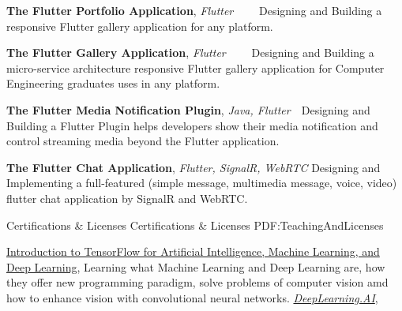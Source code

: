 \documentclass[letterpaper,MMMyyyy,nonstopmode]{resume}
\newcommand{\CVWebpage}{https://aliyazdi.tech}
\begin{document}
\begin{Body}
\BigGap
\BulletItem
\textbf{The Flutter Portfolio Application},
\textit{\small{Flutter}}
\hfill
{\normalsize{
\href{https://snapcraft.io/aliyazdi}
{\faLinux}
\,\SubBulletSymbol\,
\href{https://github.com/aliyazdi75/aliyazdi75.github.io/releases}
{\faAndroid}
\,\SubBulletSymbol\,
\href{\CVWebpage}
{\faGlobe}
\,\SubBulletSymbol\,
\href{https://github.com/aliyazdi75/aliyazdi75.github.io}
{\faGithub}
}}
\Item
Designing and Building a responsive Flutter gallery application for any platform.

\BigGap
\BulletItem
\textbf{The Flutter Gallery Application},
\textit{\small{Flutter}}
\hfill
{\normalsize{
\href{https://medium.com/flutter-community/the-software-engineering-approach-in-cross-platform-programming-with-flutter-part-1-efcdc8a8fc26?source=friends_link&sk=ceb60f56685ce66c7f9574595748f25b}
{\faMedium}
\,\SubBulletSymbol\,
\href{https://github.com/aliyazdi75/gallery/releases}
{\faAndroid}
\,\SubBulletSymbol\,
\href{\CVWebpage/gallery}
{\faGlobe}
\,\SubBulletSymbol\,
\href{https://github.com/aliyazdi75/gallery}
{\faGithub}
}}
\Item
Designing and Building a micro-service architecture responsive Flutter gallery application for Computer Engineering graduates uses in any platform.

\BigGap
\BulletItem
\textbf{The Flutter Media Notification Plugin},
\textit{\small{Java, Flutter}}
\hfill
{\normalsize{
\href{https://pub.dev/packages/flutter_media_notification}
{\faGlobe}
\,\SubBulletSymbol\,
\href{https://github.com/aliyazdi75/flutter_media_notification}
{\faGithub}
}}
\Item
Designing and Building a Flutter Plugin helps developers show their media notification and control streaming media beyond the Flutter application.

\BigGap
\BulletItem
\textbf{The Flutter Chat Application},
\textit{\small{Flutter, SignalR, WebRTC}}
\hfill
{\normalsize{
\href{https://github.com/aliyazdi75/flutter_chat}
{\faGithub}
}}
\Item
Designing and Implementing a full-featured (simple message, multimedia message, voice, video) flutter chat application by SignalR and WebRTC.


\Section
{Certifications \newline\&
Licenses}
{Certifications \& Licenses}
{PDF:TeachingAndLicenses}

\BulletItem
\href{https://coursera.org/share/81c743eeff5bf3e85dfc118ab47b9407}
{Introduction to TensorFlow for Artificial Intelligence, Machine Learning, and Deep Learning},
\Item
Learning what Machine Learning and Deep Learning are, how they offer new programming paradigm, solve problems of computer vision amd how to enhance vision with convolutional neural networks.
\newline
\href{https://www.deeplearning.ai/}
{\textit{DeepLearning.AI}},



\end{Body}
\end{document}
